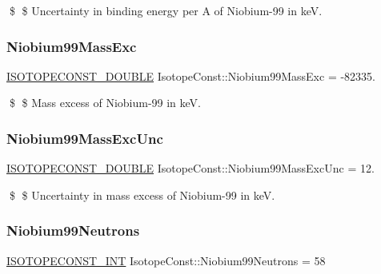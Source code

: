 \$ \$ Uncertainty in binding energy per A of Niobium-\/99 in keV. \mbox{\label{group___isotope_const-_niobium-_nb99_ga1a0c64871bbabe5e9585596c9d734c13}} 
\subsubsection{\texorpdfstring{Niobium99\+Mass\+Exc}{Niobium99MassExc}}
{\footnotesize\ttfamily \mbox{\hyperlink{group___isotope_const-_macros_ga8f45a7272ce02c0b4c65c44636ed719a}{I\+S\+O\+T\+O\+P\+E\+C\+O\+N\+S\+T\+\_\+\+D\+O\+U\+B\+LE}} Isotope\+Const\+::\+Niobium99\+Mass\+Exc = -\/82335.}

\$ \$ Mass excess of Niobium-\/99 in keV. \mbox{\label{group___isotope_const-_niobium-_nb99_ga165d7c934e20380f9b5711421a72adb0}} 
\subsubsection{\texorpdfstring{Niobium99\+Mass\+Exc\+Unc}{Niobium99MassExcUnc}}
{\footnotesize\ttfamily \mbox{\hyperlink{group___isotope_const-_macros_ga8f45a7272ce02c0b4c65c44636ed719a}{I\+S\+O\+T\+O\+P\+E\+C\+O\+N\+S\+T\+\_\+\+D\+O\+U\+B\+LE}} Isotope\+Const\+::\+Niobium99\+Mass\+Exc\+Unc = 12.}

\$ \$ Uncertainty in mass excess of Niobium-\/99 in keV. \mbox{\label{group___isotope_const-_niobium-_nb99_gafb5d2f1fc8a84221b69717596f4c81b7}} 
\subsubsection{\texorpdfstring{Niobium99\+Neutrons}{Niobium99Neutrons}}
{\footnotesize\ttfamily \mbox{\hyperlink{group___isotope_const-_macros_ga5f18360b3e99483a35c32d789e62621c}{I\+S\+O\+T\+O\+P\+E\+C\+O\+N\+S\+T\+\_\+\+I\+NT}} Isotope\+Const\+::\+Niobium99\+Neutrons = 58}

